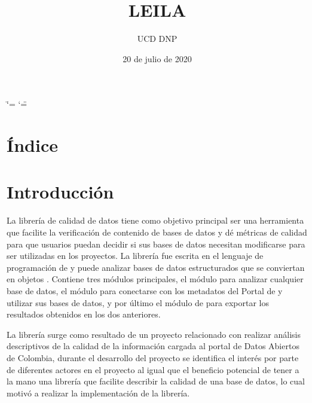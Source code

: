 \documentclass[letterpaper,10pt,openany,spanish]{sphinxmanual}
\title{LEILA}
\date{20 de julio de 2020}
\author{UCD \sphinxhyphen{} DNP}
\begin{document}
\ifdefined\shorthandoff
  \ifnum\catcode`\=\string=\active\shorthandoff{=}\fi
  \ifnum\catcode`\"=\active{}\fi
\fi

\pagestyle{empty}
\sphinxmaketitle
\pagestyle{plain}
\sphinxtableofcontents
\pagestyle{normal}
\label{\detokenize{index::doc}}



\chapter{Índice}
\label{\detokenize{genindex:indice}}\label{\detokenize{genindex:genindex}}\label{\detokenize{genindex::doc}}

\chapter{Introducción}
\label{\detokenize{introduccion:introduccion}}\label{\detokenize{introduccion::doc}}
La librería de calidad de datos tiene como objetivo principal ser una herramienta que facilite la verificación de contenido de bases de datos y dé métricas de calidad para que usuarios puedan decidir si sus bases de datos necesitan modificarse para ser utilizadas en los proyectos. La librería fue escrita en el lenguaje de programación de  y puede analizar bases de datos estructurados que se conviertan en objetos . Contiene tres módulos principales, el módulo {\hyperref[\detokenize{calidad_datos:calidad-datos}]{}} para analizar cualquier base de datos, el módulo {\hyperref[\detokenize{datos_gov:datos-gov}]{}} para conectarse con los metadatos del Portal de  y utilizar sus bases de datos, y por último el módulo de {\hyperref[\detokenize{reporte:reporte}]{}} para exportar los resultados obtenidos en los dos anteriores.

La librería surge como resultado de un proyecto relacionado con realizar análisis descriptivos de la calidad de la información cargada al portal de Datos Abiertos de Colombia, durante el desarrollo del proyecto se identifica el interés por parte de diferentes actores en el proyecto al igual que el beneficio potencial de tener a la mano una librería que facilite describir la calidad de una base de datos, lo cual motivó a realizar la implementación de la librería.
\end{document}
